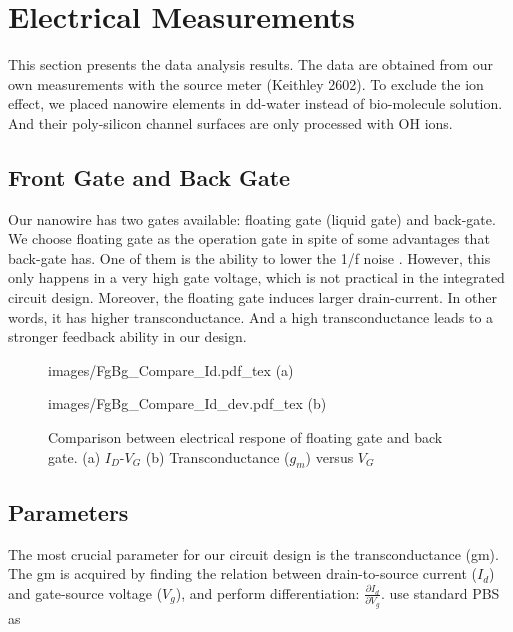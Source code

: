\section{Electrical Measurements}
This section presents the data analysis results.
The data are obtained from our own measurements with the source meter (Keithley 2602).
To exclude the ion effect, we placed nanowire elements in dd-water instead of bio-molecule solution.
And their poly-silicon channel surfaces are only processed with {\color{red}OH ions.}

\subsection*{Front Gate and Back Gate}
Our nanowire has two gates available: floating gate (liquid gate) and back-gate.
We choose floating gate as the operation gate in spite of some advantages that back-gate has.
One of them is the ability to lower the 1/f noise \cite{C7, C8}.
However, this only happens in a very high gate voltage, which is not practical in the integrated circuit design.
Moreover, the floating gate induces larger drain-current.
In other words, it has higher transconductance. And a high transconductance leads to a stronger feedback ability in our design.


\begin{figure}[!htbp]
    \centering
    \begin{minipage}[t][0.1\textheight]{1\textwidth}
        \centering
        \def\svgwidth{10cm}
        \fontsize{6}{15}\selectfont
         {images/FgBg_Compare_Id.pdf_tex}
        (a)
    \end{minipage}
    \vfill
    \begin{minipage}[t][0.1\textheight]{1\textwidth}
        \centering
        \def\svgwidth{10cm}
        \fontsize{6}{15}\selectfont
         {images/FgBg_Compare_Id_dev.pdf_tex}
        (b)
    \end{minipage}
    \caption{Comparison between electrical respone of floating gate and back gate. (a) $I_D$-$V_G$  (b) Transconductance ($g_m$) versus $V_G$}
    \label{fig:IdVgandgbsId}
\end{figure}

\subsection{Parameters}
The most crucial parameter for our circuit design is the transconductance (gm).
{\color{red}
    The gm is acquired by finding the relation between drain-to-source current ($I_d$) and gate-source voltage ($V_g$), and perform differentiation: $\frac{\partial I_d}{\partial V_g}$.
    use standard PBS as
}

